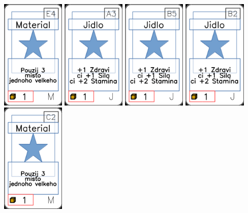 \documentclass[a4paper]{article}
\begin{document}
	\includegraphics[width=3.0cm]{img-1_53}
	\includegraphics[width=3.0cm]{img-1_2}
	\includegraphics[width=3.0cm]{img-1_9}
	\includegraphics[width=3.0cm]{img-1_6}
	\includegraphics[width=3.0cm]{img-1_41}
\end{document}

